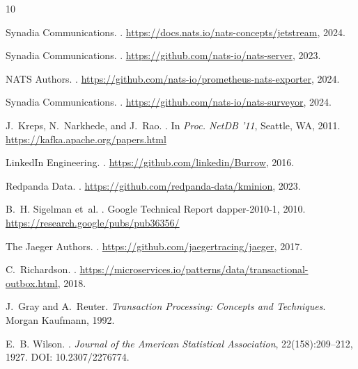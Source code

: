 \documentclass[journal]{IEEEtran}
\begin{document}
\begin{thebibliography}{10}

Synadia Communications.
.
\newblock \url{https://docs.nats.io/nats-concepts/jetstream}, 2024.

Synadia Communications.
.
\newblock \url{https://github.com/nats-io/nats-server}, 2023.

{NATS Authors}.
.
\newblock \url{https://github.com/nats-io/prometheus-nats-exporter}, 2024.

Synadia Communications.
.
\newblock \url{https://github.com/nats-io/nats-surveyor}, 2024.

J.~Kreps, N.~Narkhede, and J.~Rao.
.
\newblock In \emph{Proc. NetDB '11}, Seattle, WA, 2011.
\newblock \url{https://kafka.apache.org/papers.html}

LinkedIn Engineering.
.
\newblock \url{https://github.com/linkedin/Burrow}, 2016.

Redpanda Data.
.
\newblock \url{https://github.com/redpanda-data/kminion}, 2023.

B.~H. Sigelman et~al.
.
\newblock Google Technical Report dapper-2010-1, 2010.
\newblock \url{https://research.google/pubs/pub36356/}

The Jaeger Authors.
.
\newblock \url{https://github.com/jaegertracing/jaeger}, 2017.

C.~Richardson.
.
\newblock \url{https://microservices.io/patterns/data/transactional-outbox.html},
  2018.

J.~Gray and A.~Reuter.
\newblock \emph{Transaction Processing: Concepts and Techniques}.
\newblock Morgan Kaufmann, 1992.


E.~B. Wilson.
.
\newblock \emph{Journal of the American Statistical Association},
  22(158):209--212, 1927.
\newblock DOI: 10.2307/2276774.


\end{thebibliography}
\end{document}
